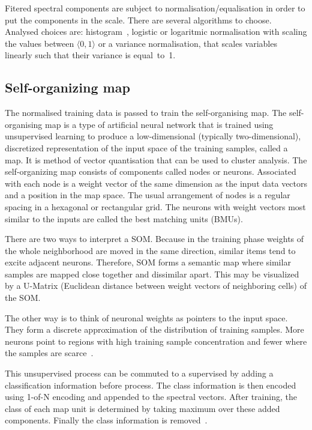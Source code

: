 \documentclass[a4paper]{IEEEtran}
\begin{document}
Fitered spectral components are subject to normalisation/equalisation
in order to put the components
in the scale. There are several algorithms to choose. Analysed choices are:
histogram~\cite{hist}, logistic or logaritmic normalisation
with scaling the values between $ \langle 0, 1 \rangle $ or a variance normalisation,
that scales variables linearly such that their variance is equal~to~1.

\subsection{Self-organizing map}
The normalised training data is passed to train the self-organising map.
The self-organising map is a type of artificial neural network that is
trained using unsupervised learning to produce a low-dimensional 
(typically two-dimensional), discretized representation of the input 
space of the training samples, called a map. It is method of vector 
quantisation that can be used to cluster analysis.
The self-organizing map consists of components called nodes or neurons. 
Associated with each node is a weight vector of the same dimension 
as the input data vectors and a position in the map space.
The usual arrangement of nodes is a regular spacing in a hexagonal or rectangular grid. 
The neurons with weight vectors most similar to the inputs are called 
the best matching units (BMUs).

There are two ways to interpret a SOM. 
Because in the training phase weights of the whole neighborhood are moved in the 
same direction, similar items tend to excite adjacent neurons. Therefore, 
SOM forms a semantic map where similar samples are mapped close together 
and dissimilar apart. This may be visualized by a U-Matrix 
(Euclidean distance between weight vectors of neighboring cells) of the SOM.

The other way is to think of neuronal weights as pointers to the input space. 
They form a discrete approximation of the distribution of training samples.
More neurons point to regions with high training sample concentration and 
fewer where the samples are scarce~\cite{somwiki}.

This unsupervised process can be commuted to a supervised by adding a classification
information before process.
The class information is then encoded using 1-of-N encoding and appended to the 
spectral vectors. After training, the class of each map unit
is determined by taking maximum over these added components.
Finally the class information is removed~\cite{somtoolbox}.
\end{document}
